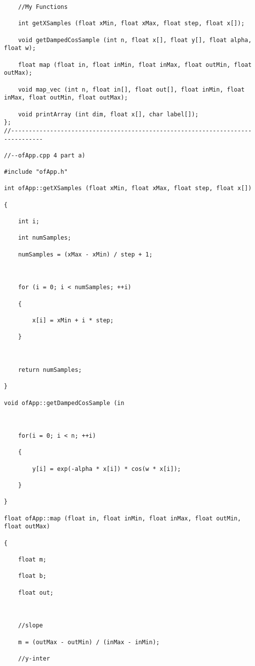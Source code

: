 \documentclass[letterpaper, 24pt, final, onecolumn, titlepage] {article}
\begin{document}
\begin{lstlisting}
    //My Functions

    int getXSamples (float xMin, float xMax, float step, float x[]);

    void getDampedCosSample (int n, float x[], float y[], float alpha, float w);

    float map (float in, float inMin, float inMax, float outMin, float outMax);

    void map_vec (int n, float in[], float out[], float inMin, float inMax, float outMin, float outMax);

    void printArray (int dim, float x[], char label[]);
};
//-------------------------------------------------------------------------------

//--ofApp.cpp 4 part a)

#include "ofApp.h"

int ofApp::getXSamples (float xMin, float xMax, float step, float x[])

{

    int i;

    int numSamples;

    numSamples = (xMax - xMin) / step + 1;



    for (i = 0; i < numSamples; ++i)

    {

        x[i] = xMin + i * step;

    }



    return numSamples;

}

void ofApp::getDampedCosSample (in



    for(i = 0; i < n; ++i)

    {

        y[i] = exp(-alpha * x[i]) * cos(w * x[i]);

    }

}

float ofApp::map (float in, float inMin, float inMax, float outMin, float outMax)

{

    float m;

    float b;

    float out;



    //slope

    m = (outMax - outMin) / (inMax - inMin);

    //y-inter


\end{lstlisting}
\end{document}
